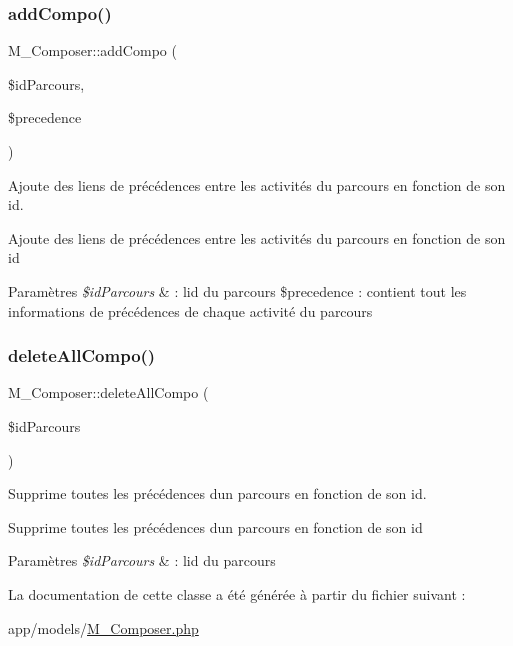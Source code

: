 \subsubsection{\texorpdfstring{add\+Compo()}{addCompo()}}
{\footnotesize\ttfamily M\+\_\+\+Composer\+::add\+Compo (\begin{DoxyParamCaption}\item[{}]{\$id\+Parcours,  }\item[{}]{\$precedence }\end{DoxyParamCaption})}



Ajoute des liens de précédences entre les activités du parcours en fonction de son id. 

Ajoute des liens de précédences entre les activités du parcours en fonction de son id 
\begin{DoxyParams}{Paramètres}
{\em \$id\+Parcours} & \+: l\textquotesingle{}id du parcours \$precedence \+: contient tout les informations de précédences de chaque activité du parcours \\
\hline
\end{DoxyParams}
\mbox{\label{class_m___composer_af322ea3745d7e49c2a8ee4228a7611a5}} 
\subsubsection{\texorpdfstring{delete\+All\+Compo()}{deleteAllCompo()}}
{\footnotesize\ttfamily M\+\_\+\+Composer\+::delete\+All\+Compo (\begin{DoxyParamCaption}\item[{}]{\$id\+Parcours }\end{DoxyParamCaption})}



Supprime toutes les précédences d\textquotesingle{}un parcours en fonction de son id. 

Supprime toutes les précédences d\textquotesingle{}un parcours en fonction de son id 
\begin{DoxyParams}{Paramètres}
{\em \$id\+Parcours} & \+: l\textquotesingle{}id du parcours \\
\hline
\end{DoxyParams}


La documentation de cette classe a été générée à partir du fichier suivant \+:\begin{DoxyCompactItemize}
\item 
app/models/\hyperlink{_m___composer_8php}{M\+\_\+\+Composer.\+php}\end{DoxyCompactItemize}
